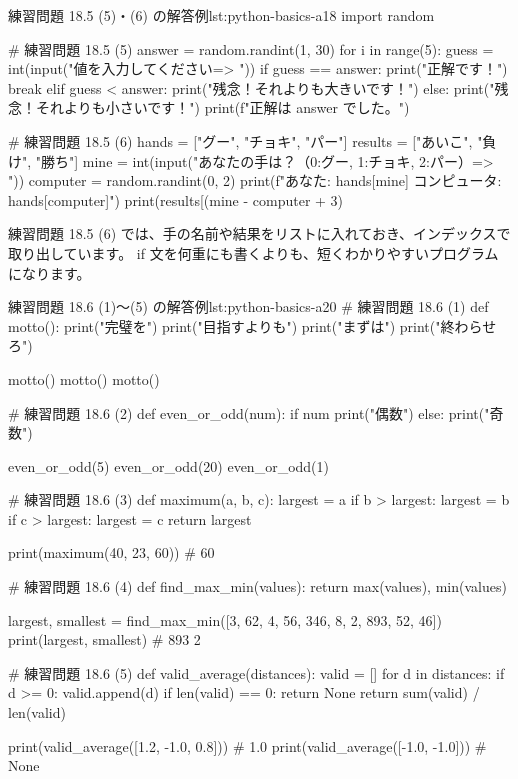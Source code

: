 \begin{codelisting}[style=python]{練習問題 18.5 (5)・(6) の解答例}{lst:python-basics-a18}
import random

# 練習問題 18.5 (5)
answer = random.randint(1, 30)
for i in range(5):
    guess = int(input("値を入力してください=> "))
    if guess == answer:
        print("正解です！")
        break
    elif guess < answer:
        print("残念！それよりも大きいです！")
    else:
        print("残念！それよりも小さいです！")
print(f"正解は {answer} でした。")

# 練習問題 18.5 (6)
hands = ["グー", "チョキ", "パー"]
results = ["あいこ", "負け", "勝ち"]
mine = int(input("あなたの手は？（0:グー, 1:チョキ, 2:パー）=> "))
computer = random.randint(0, 2)
print(f"あなた: {hands[mine]}  コンピュータ: {hands[computer]}")
print(results[(mine - computer + 3) %
\end{codelisting}

練習問題 18.5 (6) では、手の名前や結果をリストに入れておき、インデックスで取り出しています。
if 文を何重にも書くよりも、短くわかりやすいプログラムになります。

\begin{codelisting}[style=python]{練習問題 18.6 (1)〜(5) の解答例}{lst:python-basics-a20}
# 練習問題 18.6 (1)
def motto():
    print("完璧を")
    print("目指すよりも")
    print("まずは")
    print("終わらせろ")


motto()
motto()
motto()


# 練習問題 18.6 (2)
def even_or_odd(num):
    if num %
        print("偶数")
    else:
        print("奇数")


even_or_odd(5)
even_or_odd(20)
even_or_odd(1)


# 練習問題 18.6 (3)
def maximum(a, b, c):
    largest = a
    if b > largest:
        largest = b
    if c > largest:
        largest = c
    return largest


print(maximum(40, 23, 60))   # 60


# 練習問題 18.6 (4)
def find_max_min(values):
    return max(values), min(values)


largest, smallest = find_max_min([3, 62, 4, 56, 346, 8, 2, 893, 52, 46])
print(largest, smallest)   # 893 2


# 練習問題 18.6 (5)
def valid_average(distances):
    valid = []
    for d in distances:
        if d >= 0:
            valid.append(d)
    if len(valid) == 0:
        return None
    return sum(valid) / len(valid)


print(valid_average([1.2, -1.0, 0.8]))   # 1.0
print(valid_average([-1.0, -1.0]))       # None
\end{codelisting}

